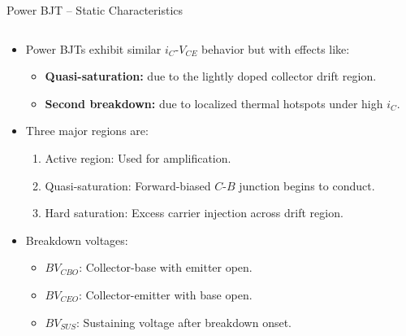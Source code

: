 \begin{frame}{Power BJT – Static Characteristics}
    \begin{columns}
    \begin{column}{0.6\textwidth}

    \begin{itemize}
        \item Power BJTs exhibit similar $i_C$-$V_{CE}$ behavior but with effects like:
        \begin{itemize}
            \item \textbf{Quasi-saturation:} due to the lightly doped collector drift region.
            \item \textbf{Second breakdown:} due to localized thermal hotspots under high $i_C$.
        \end{itemize}
        \item Three major regions are:
        \begin{enumerate}
            \item Active region: Used for amplification.
            \item Quasi-saturation: Forward-biased $C$-$B$ junction begins to conduct.
            \item Hard saturation: Excess carrier injection across drift region.
        \end{enumerate}
        \item Breakdown voltages:
        \begin{itemize}
            \item $BV_{CBO}$: Collector-base with emitter open.
            \item $BV_{CEO}$: Collector-emitter with base open.
            \item $BV_{SUS}$: Sustaining voltage after breakdown onset.
        \end{itemize}
    \end{itemize}
    \end{column}


\end{columns}
\end{frame}

